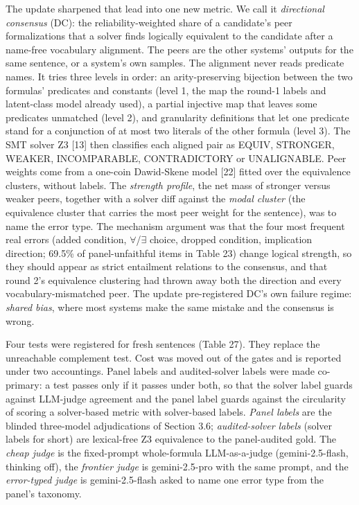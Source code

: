\documentclass[11pt,letterpaper]{article}
\begin{document}
The update sharpened that lead into one new metric. We call it \emph{directional consensus} (DC): the reliability-weighted share of a candidate's peer formalizations that a solver finds logically equivalent to the candidate after a name-free vocabulary alignment. The peers are the other systems' outputs for the same sentence, or a system's own samples. The alignment never reads predicate names. It tries three levels in order: an arity-preserving bijection between the two formulas' predicates and constants (level 1, the map the round-1 labels and latent-class model already used), a partial injective map that leaves some predicates unmatched (level 2), and granularity definitions that let one predicate stand for a conjunction of at most two literals of the other formula (level 3). The SMT solver Z3 [13] then classifies each aligned pair as EQUIV, STRONGER, WEAKER, INCOMPARABLE, CONTRADICTORY or UNALIGNABLE. Peer weights come from a one-coin Dawid-Skene model [22] fitted over the equivalence clusters, without labels. The \emph{strength profile}, the net mass of stronger versus weaker peers, together with a solver diff against the \emph{modal cluster} (the equivalence cluster that carries the most peer weight for the sentence), was to name the error type. The mechanism argument was that the four most frequent real errors (added condition, $\forall$/$\exists$ choice, dropped condition, implication direction; 69.5\% of panel-unfaithful items in Table 23) change logical strength, so they should appear as strict entailment relations to the consensus, and that round 2's equivalence clustering had thrown away both the direction and every vocabulary-mismatched peer. The update pre-registered DC's own failure regime: \emph{shared bias}, where most systems make the same mistake and the consensus is wrong.

Four tests were registered for fresh sentences (Table 27). They replace the unreachable complement test. Cost was moved out of the gates and is reported under two accountings. Panel labels and audited-solver labels were made co-primary: a test passes only if it passes under both, so that the solver label guards against LLM-judge agreement and the panel label guards against the circularity of scoring a solver-based metric with solver-based labels. \emph{Panel labels} are the blinded three-model adjudications of Section 3.6; \emph{audited-solver labels} (solver labels for short) are lexical-free Z3 equivalence to the panel-audited gold. The \emph{cheap judge} is the fixed-prompt whole-formula LLM-as-a-judge (gemini-2.5-flash, thinking off), the \emph{frontier judge} is gemini-2.5-pro with the same prompt, and the \emph{error-typed judge} is gemini-2.5-flash asked to name one error type from the panel's taxonomy.
\end{document}
